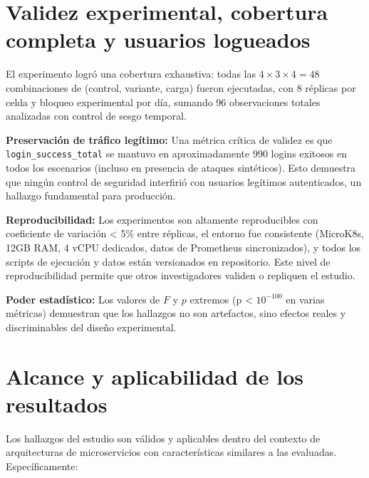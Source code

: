 \section{Validez experimental, cobertura completa y usuarios logueados}

El experimento logró una cobertura exhaustiva: todas las $4 \times 3 \times 4 = 48$ combinaciones de (control, variante, carga) fueron ejecutadas, con 8 réplicas por celda y bloqueo experimental por día, sumando 96 observaciones totales analizadas con control de sesgo temporal.

\textbf{Preservación de tráfico legítimo:} Una métrica crítica de validez es que \texttt{login\_success\_total} se mantuvo en aproximadamente 990 logins exitosos en todos los escenarios (incluso en presencia de ataques sintéticos). Esto demuestra que ningún control de seguridad interfirió con usuarios legítimos autenticados, un hallazgo fundamental para producción.

\textbf{Reproducibilidad:} Los experimentos son altamente reproducibles con coeficiente de variación < 5\% entre réplicas, el entorno fue consistente (MicroK8s, 12GB RAM, 4 vCPU dedicados, datos de Prometheus sincronizados), y todos los scripts de ejecución y datos están versionados en repositorio. Este nivel de reproducibilidad permite que otros investigadores validen o repliquen el estudio.

\textbf{Poder estadístico:} Los valores de $F$ y $p$ extremos (p < $10^{-100}$ en varias métricas) demuestran que los hallazgos no son artefactos, sino efectos reales y discriminables del diseño experimental.

\section{Alcance y aplicabilidad de los resultados}

Los hallazgos del estudio son válidos y aplicables dentro del contexto de arquitecturas de microservicios con características similares a las evaluadas. Específicamente:

